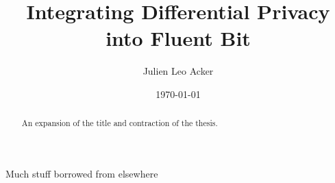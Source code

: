\documentclass[bsc]{abdnthesis}
\title{Integrating Differential Privacy into Fluent Bit}
\author{Julien Leo Acker}
\date{\today}
\begin{document}

\maketitle
\makedeclaration


\begin{abstract}
  An expansion of the title and contraction of the thesis.
\end{abstract}

\begin{acknowledgements}
  Much stuff borrowed from elsewhere
\end{acknowledgements}


\tableofcontents


% 
% 


% 

% 
% 
% 

\appendix




\end{document}
